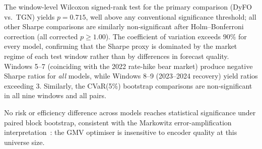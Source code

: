 \documentclass[runningheads]{llncs}
\begin{document}
The window-level Wilcoxon signed-rank test for the primary comparison (DyFO vs.\ TGN) yields $p = 0.715$, well above any conventional significance threshold; all other Sharpe comparisons are similarly non-significant after Holm--Bonferroni correction (all corrected $p \geq 1.00$). The coefficient of variation exceeds $90\%$ for every model, confirming that the Sharpe proxy is dominated by the market regime of each test window rather than by differences in forecast quality. Windows 5--7 (coinciding with the 2022 rate-hike bear market) produce negative Sharpe ratios for \emph{all} models, while Windows 8--9 (2023--2024 recovery) yield ratios exceeding 3. Similarly, the CVaR(5\%) bootstrap comparisons are non-significant in all nine windows and all pairs.



No risk or efficiency difference across models reaches statistical significance under paired block bootstrap, consistent with the Markowitz error-amplification interpretation~\cite{michaud1989markowitz}: the GMV optimiser is insensitive to encoder quality at this universe size.
\end{document}
